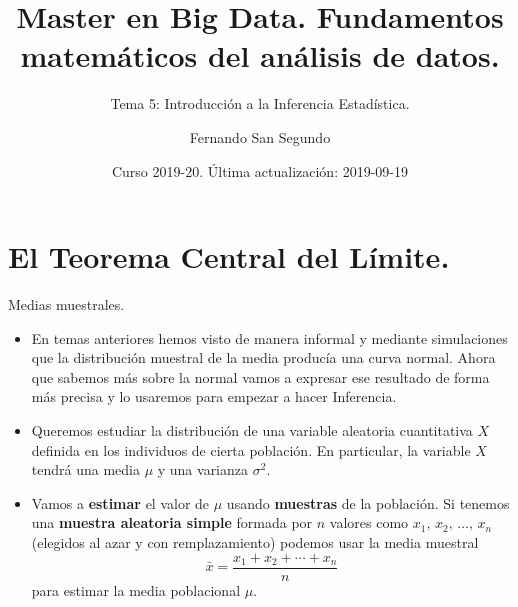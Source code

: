 \documentclass[
  9pt,
  ignorenonframetext,
]{beamer}
\title{Master en Big Data. Fundamentos matemáticos del análisis de datos.}
\subtitle{Tema 5: Introducción a la Inferencia Estadística.}
\author{Fernando San Segundo}
\date{Curso 2019-20. Última actualización: 2019-09-19}
\begin{document}
\frame{\titlepage}


\begin{frame}
  \tableofcontents[hideallsubsections]
\end{frame}
\hypertarget{el-teorema-central-del-limite.}{%
\section{El Teorema Central del
Límite.}\label{el-teorema-central-del-limite.}}

\begin{frame}{Medias muestrales.}
\protect\hypertarget{medias-muestrales.}{}

\begin{itemize}
\item
  En temas anteriores hemos visto de manera informal y mediante
  simulaciones que la distribución muestral de la media producía una
  curva normal. Ahora que sabemos más sobre la normal vamos a expresar
  ese resultado de forma más precisa y lo usaremos para empezar a hacer
  Inferencia.
\item
  Queremos estudiar la distribución de una variable aleatoria
  cuantitativa \(X\) definida en los individuos de cierta población. En
  particular, la variable \(X\) tendrá una media \(\mu\) y una varianza
  \(\sigma^2\). 
\item
  Vamos a \textbf{estimar} el valor de \(\mu\) usando \textbf{muestras}
  de la población. Si tenemos una \textbf{muestra aleatoria simple}
  formada por \(n\) valores como \(x_1,\, x_2,\,\ldots,\, x_n\)
  (elegidos al azar y con remplazamiento) podemos usar la media muestral
  \[
  \bar x = \dfrac{x_1 + x_2 + \cdots + x_n}{n}
  \] para estimar la media poblacional \(\mu\).
\end{itemize}

\end{frame}
\end{document}

